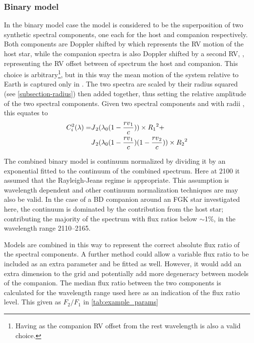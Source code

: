 \subsubsection{Binary model}
\label{subsubsec:binary-model}
In the binary model case the model is considered to be the superposition of two synthetic spectral components, one each for the host and companion respectively.
Both components are Doppler shifted by \Rvone{} which represents the {RV} motion of the host star, while the companion spectra is also Doppler shifted by a second {RV}, \Rvtwo{}, representing the {RV} offset between of spectrum the host and companion.
This choice is arbitrary\footnote{Having \Rvtwo{} as the companion {RV} offset from the rest wavelength is also a valid choice.}, but in this way the mean motion of the system relative to Earth is captured only in \Rvone{}.
The two spectra are scaled by their radius squared (see \cref{subsection-radius}) then added together, thus setting the relative amplitude of the two spectral components.
Given two spectral components \Jone{} and \Jtwo{} with radii \Rone{}, \Rtwo{} this equates to
\begin{align}
C^{2}_{i}(\lambda) = & {J{}}_{2}{}(\lambda_{0}(1 - \frac{{rv{}}_{1}{}}{c}))\times {{R}_{1}}^{2} +\nonumber \\
& {J{}}_{2}{}(\lambda_{0}(1 - \frac{{rv{}}_{1}{}}{c})(1 - \frac{{rv{}}_{2}{}}{c}))\times {{R}_{2}{}}^{2}
\end{align}

The combined binary model is continuum normalized by dividing it by an exponential fitted to the continuum of the combined spectrum.
Here at 2100\nm{} it assumed that the Rayleigh-Jeans regime is appropriate.
This assumption is wavelength dependent and other continuum normalization techniques are may also be valid.
In the case of a {BD} companion around an {FGK} star investigated here, the continuum is dominated by the contribution from the host star; contributing the majority of the spectrum with flux ratios below \(\sim\)1\%, in the wavelength range 2110--2165\nm{}.

Models are combined in this way to represent the correct absolute flux ratio of the spectral components.
A further method could allow a variable flux ratio to be included as an extra parameter and be fitted as well.
However, it would add an extra dimension to the \textchisquared{} grid and potentially add more degeneracy between models of the companion.
The median flux ratio between the two components is calculated for the wavelength range used here as an indication of the flux ratio level.
This given as \({F}_{2}/{F}_{1}\) in \cref{tab:example_params}

